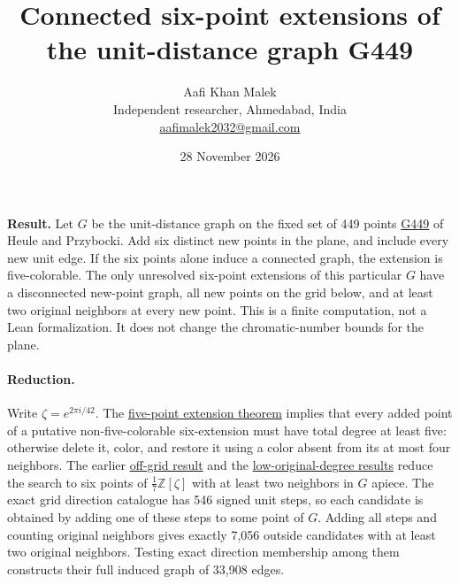 \documentclass[10pt,letterpaper]{article}
\title{Connected six-point extensions of the unit-distance graph G449}
\author{Aafi Khan Malek\\ \small Independent researcher, Ahmedabad, India\\
\small\href{mailto:aafimalek2032@gmail.com}{aafimalek2032@gmail.com}}
\date{28 November 2026}
\begin{document}
\maketitle

\noindent\textbf{Result.}
Let \(G\) be the unit-distance graph on the fixed set of 449 points
\href{https://github.com/bprzybocki/G449/tree/125bfda97ed1d336f84694de04dedcfb349c5164}{G449}
of Heule and Przybocki. Add six distinct new points in the plane,
and include every new unit edge. If the six points alone induce a
connected graph, the extension is five-colorable. The only
unresolved six-point extensions of this particular \(G\) have a
disconnected new-point graph, all new points on the grid below,
and at least two original neighbors at every new point.
This is a finite computation, not a Lean formalization.
It does not change the chromatic-number bounds for the plane.

\paragraph{Reduction.}
Write \(\zeta=e^{2\pi i/42}\). The
\href{https://github.com/Aafimalek/novel-discoveries/tree/234e0ce194fdfa544d4b551ccea9898b2239dc69/hadwiger-nelson/verification/g449/prime-seven-catalogue/five-point-extensions}{five-point extension theorem}
implies that every added point of a putative non-five-colorable
six-extension must have total degree at least five: otherwise
delete it, color, and restore it using a color absent from its
at most four neighbors. The earlier
\href{https://github.com/Aafimalek/novel-discoveries/tree/6376de4361b98f605326dd6275fa5f9e8b5dd3fb/hadwiger-nelson/verification/g449/prime-seven-catalogue/six-off-grid-extensions}{off-grid result}
and the
\href{https://github.com/Aafimalek/novel-discoveries/tree/f7be4c235d3d6bc073058db7fb201663ed7955e7/hadwiger-nelson/verification/g449/prime-seven-catalogue/six-grid-one-nonuniversal}{low-original-degree results}
reduce the search to six points of \(\tfrac17\mathbb Z[\zeta]\)
with at least two neighbors in \(G\) apiece. The exact grid direction
catalogue has 546 signed unit steps, so each candidate is obtained
by adding one of these steps to some point of \(G\).
Adding all steps and counting original neighbors gives exactly
7,056 outside candidates with at least two original neighbors.
Testing exact direction membership among them constructs
their full induced graph of 33,908 edges.
\end{document}
